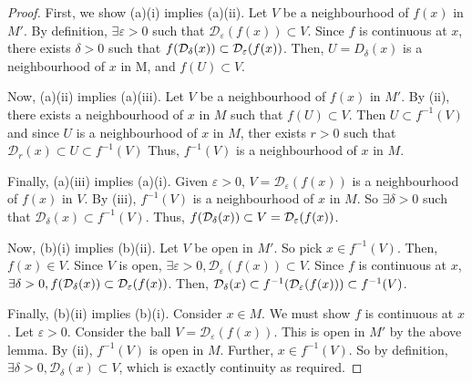 \begin{proof}
	First, we show (a)(i) implies (a)(ii). %
	Let \( V \) be a neighbourhood of \( f(x) \) in \( M' \).
	By definition, \( \exists \varepsilon > 0 \) such that \( \mathcal D_\varepsilon(f(x)) \subset V \).
	Since \( f \) is continuous at \( x \), there exists \( \delta > 0 \) such that \( f\qty(\mathcal D_\delta(x)) \subset \mathcal D_\varepsilon(f(x)) \).
	Then, \( U = D_\delta(x) \) is a neighbourhood of \( x \) in M, and \( f(U) \subset V \).

	Now, (a)(ii) implies (a)(iii). %
	Let \( V \) be a neighbourhood of \( f(x) \) in \( M' \).
	By (ii), there exists a neighbourhood of \( x \) in \( M \) such that \( f(U) \subset V \).
	Then \( U \subset f^{-1}(V) \) and since \( U \) is a neighbourhood of \( x \) in \( M \), ther exists \( r > 0 \) such that \( \mathcal D_r(x) \subset U \subset f^{-1}(V) \)
	Thus, \( f^{-1}(V) \) is a neighbourhood of \( x \) in \( M \).

	Finally, (a)(iii) implies (a)(i). %
	Given \( \varepsilon > 0 \), \( V = \mathcal D_\varepsilon(f(x)) \) is a neighbourhood of \( f(x) \) in \( V \).
	By (iii), \( f^{-1}(V) \) is a neighbourhood of \( x \) in \( M \).
	So \( \exists \delta > 0 \) such that \( \mathcal D_\delta(x) \subset f^{-1}(V) \).
	Thus, \( f\qty(\mathcal D_\delta(x)) \subset V = \mathcal D_\varepsilon(f(x)) \).

	Now, (b)(i) implies (b)(ii). %
	Let \( V \) be open in \( M' \).
	So pick \( x \in f^{-1}(V) \).
	Then, \( f(x) \in V \).
	Since \( V \) is open, \( \exists \varepsilon > 0, \mathcal D_\varepsilon(f(x)) \subset V \).
	Since \( f \) is continuous at \( x \), \( \exists \delta > 0, f\qty(\mathcal D_\delta(x)) \subset \mathcal D_\varepsilon(f(x)) \).
	Then, \( \mathcal D_\delta(x) \subset f^{-1}\qty(\mathcal D_\varepsilon(f(x))) \subset f^{-1}(V) \).

	Finally, (b)(ii) implies (b)(i). %
	Consider \( x \in M \).
	We must show \( f \) is continuous at \( x \).
	Let \( \varepsilon > 0 \).
	Consider the ball \( V = \mathcal D_\varepsilon(f(x)) \).
	This is open in \( M' \) by the above lemma.
	By (ii), \( f^{-1}(V) \) is open in \( M \).
	Further, \( x \in f^{-1}(V) \).
	So by definition, \( \exists \delta > 0, \mathcal D_\delta(x) \subset V \), which is exactly continuity as required.
\end{proof}

